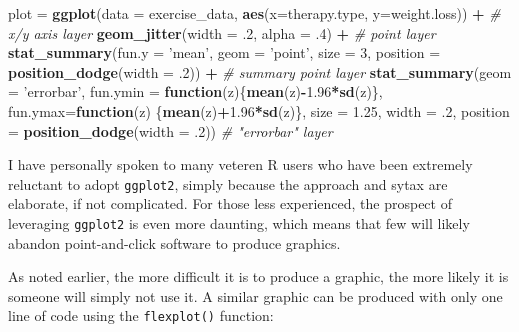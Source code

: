 \documentclass[
  doc]{apa6}
\newenvironment{Shaded}{\begin{snugshade}}{\end{snugshade}}
\newcommand{\CommentTok}[1]{\textcolor[rgb]{0.56,0.35,0.01}{\textit{#1}}}
\newcommand{\ControlFlowTok}[1]{\textcolor[rgb]{0.13,0.29,0.53}{\textbf{#1}}}
\newcommand{\DataTypeTok}[1]{\textcolor[rgb]{0.13,0.29,0.53}{#1}}
\newcommand{\DecValTok}[1]{\textcolor[rgb]{0.00,0.00,0.81}{#1}}
\newcommand{\FloatTok}[1]{\textcolor[rgb]{0.00,0.00,0.81}{#1}}
\newcommand{\KeywordTok}[1]{\textcolor[rgb]{0.13,0.29,0.53}{\textbf{#1}}}
\newcommand{\NormalTok}[1]{#1}
\newcommand{\OperatorTok}[1]{\textcolor[rgb]{0.81,0.36,0.00}{\textbf{#1}}}
\newcommand{\StringTok}[1]{\textcolor[rgb]{0.31,0.60,0.02}{#1}}
\begin{document}
\begin{Shaded}
\begin{Highlighting}[]
\NormalTok{plot =}\StringTok{ }\KeywordTok{ggplot}\NormalTok{(}\DataTypeTok{data =}\NormalTok{ exercise_data, }\KeywordTok{aes}\NormalTok{(}\DataTypeTok{x=}\NormalTok{therapy.type, }\DataTypeTok{y=}\NormalTok{weight.loss)) }\OperatorTok{+}\StringTok{ }
\StringTok{      }\CommentTok{# x/y axis layer}
\StringTok{  }\KeywordTok{geom_jitter}\NormalTok{(}\DataTypeTok{width =} \FloatTok{.2}\NormalTok{, }\DataTypeTok{alpha =} \FloatTok{.4}\NormalTok{) }\OperatorTok{+}\StringTok{ }
\StringTok{      }\CommentTok{# point layer}
\StringTok{  }\KeywordTok{stat_summary}\NormalTok{(}\DataTypeTok{fun.y =} \StringTok{'mean'}\NormalTok{, }\DataTypeTok{geom =} \StringTok{'point'}\NormalTok{, }
        \DataTypeTok{size =} \DecValTok{3}\NormalTok{, }\DataTypeTok{position =} \KeywordTok{position_dodge}\NormalTok{(}\DataTypeTok{width =} \FloatTok{.2}\NormalTok{)) }\OperatorTok{+}\StringTok{ }
\StringTok{      }\CommentTok{# summary point layer}
\StringTok{  }\KeywordTok{stat_summary}\NormalTok{(}\DataTypeTok{geom =} \StringTok{'errorbar'}\NormalTok{, }\DataTypeTok{fun.ymin =} \ControlFlowTok{function}\NormalTok{(z)\{}\KeywordTok{mean}\NormalTok{(z)}\OperatorTok{-}\FloatTok{1.96}\OperatorTok{*}\KeywordTok{sd}\NormalTok{(z)\}, }
        \DataTypeTok{fun.ymax=}\ControlFlowTok{function}\NormalTok{(z) \{}\KeywordTok{mean}\NormalTok{(z)}\OperatorTok{+}\FloatTok{1.96}\OperatorTok{*}\KeywordTok{sd}\NormalTok{(z)\}, }
        \DataTypeTok{size =} \FloatTok{1.25}\NormalTok{, }\DataTypeTok{width =} \FloatTok{.2}\NormalTok{, }\DataTypeTok{position =} \KeywordTok{position_dodge}\NormalTok{(}\DataTypeTok{width =} \FloatTok{.2}\NormalTok{))  }
      \CommentTok{# "errorbar" layer}
\end{Highlighting}
\end{Shaded}

I have personally spoken to many veteren R users who have been extremely reluctant to adopt \texttt{ggplot2}, simply because the approach and sytax are elaborate, if not complicated. For those less experienced, the prospect of leveraging \texttt{ggplot2} is even more daunting, which means that few will likely abandon point-and-click software to produce graphics.

As noted earlier, the more difficult it is to produce a graphic, the more likely it is someone will simply not use it. A similar graphic can be produced with only one line of code using the \texttt{flexplot()} function:
\end{document}
